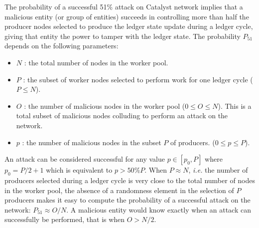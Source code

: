 The probability of a successful 51\% attack on Catalyst network implies that a malicious entity (or group of entities) succeeds in controlling more than half the producer nodes selected to produce the ledger state update during a ledger cycle, giving that entity the power to tamper with the ledger state. The probability $P_{51}$ depends on the following parameters:
\begin{itemize}
\item $N$ : the total number of nodes in the worker pool. 
\item $P$ : the subset of worker nodes selected to perform work for one ledger cycle ($P \leq N$).
\item $O$ : the number of malicious nodes in the worker pool ($0 \leq O \leq N$). This is a total subset of malicious nodes colluding to perform an attack on the network.
\item $p$ : the number of malicious nodes in the subset $P$ of producers. ($0 \leq p \leq P$).
\end{itemize}
An attack can be considered successful for any value $p \in [p_0,P]$ where $p_0 = P/2 + 1$ which is equivalent to $p > 50\%P$. When $P \approx N$, \textit{i.e.} the number of producers selected during a ledger cycle is very close to the total number of nodes in the worker pool, the absence of a randomness element in the selection of $P$ producers makes it easy to compute the probability of a successful attack on the network: $P_{51} \approx O/N$. A malicious entity would know exactly when an attack can successfully be performed, that is when $O > N/2$. \\

